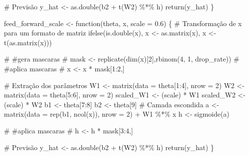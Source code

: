 \documentclass[
  a4paperpaper,
]{article}
\newenvironment{Shaded}{\begin{snugshade}}{\end{snugshade}}
\newcommand{\AttributeTok}[1]{\textcolor[rgb]{0.40,0.45,0.13}{#1}}
\newcommand{\CommentTok}[1]{\textcolor[rgb]{0.37,0.37,0.37}{#1}}
\newcommand{\ControlFlowTok}[1]{\textcolor[rgb]{0.00,0.23,0.31}{#1}}
\newcommand{\DecValTok}[1]{\textcolor[rgb]{0.68,0.00,0.00}{#1}}
\newcommand{\FloatTok}[1]{\textcolor[rgb]{0.68,0.00,0.00}{#1}}
\newcommand{\FunctionTok}[1]{\textcolor[rgb]{0.28,0.35,0.67}{#1}}
\newcommand{\NormalTok}[1]{\textcolor[rgb]{0.00,0.23,0.31}{#1}}
\newcommand{\OtherTok}[1]{\textcolor[rgb]{0.00,0.23,0.31}{#1}}
\newcommand{\SpecialCharTok}[1]{\textcolor[rgb]{0.37,0.37,0.37}{#1}}
\begin{document}
\begin{Shaded}
\begin{Highlighting}[]
  \CommentTok{\# Previsão}
\NormalTok{  y\_hat }\OtherTok{\textless{}{-}} \FunctionTok{as.double}\NormalTok{(b2 }\SpecialCharTok{+} \FunctionTok{t}\NormalTok{(W2) }\SpecialCharTok{\%*\%}\NormalTok{ h)}
  \FunctionTok{return}\NormalTok{(y\_hat)}
\NormalTok{\}}


\NormalTok{feed\_forward\_scale }\OtherTok{\textless{}{-}} \ControlFlowTok{function}\NormalTok{(theta, x, }\AttributeTok{scale =} \FloatTok{0.6}\NormalTok{) \{}
\CommentTok{\# Transformação de x para um formato de matriz}
  \FunctionTok{ifelse}\NormalTok{(}\FunctionTok{is.double}\NormalTok{(x), x }\OtherTok{\textless{}{-}} \FunctionTok{as.matrix}\NormalTok{(x), x }\OtherTok{\textless{}{-}} \FunctionTok{t}\NormalTok{(}\FunctionTok{as.matrix}\NormalTok{(x)))}
  
  \CommentTok{\# \#gera mascaras}
  \CommentTok{\# mask \textless{}{-} replicate(dim(x)[2],rbinom(4, 1, drop\_rate))}
  \CommentTok{\# \#aplica mascaras}
  \CommentTok{\# x \textless{}{-} x * mask[1:2,]}
  
  \CommentTok{\# Extração dos parâmetros}
\NormalTok{  W1 }\OtherTok{\textless{}{-}} \FunctionTok{matrix}\NormalTok{(}\AttributeTok{data =}\NormalTok{ theta[}\DecValTok{1}\SpecialCharTok{:}\DecValTok{4}\NormalTok{], }\AttributeTok{nrow =} \DecValTok{2}\NormalTok{)}
\NormalTok{  W2 }\OtherTok{\textless{}{-}} \FunctionTok{matrix}\NormalTok{(}\AttributeTok{data =}\NormalTok{ theta[}\DecValTok{5}\SpecialCharTok{:}\DecValTok{6}\NormalTok{], }\AttributeTok{nrow =} \DecValTok{2}\NormalTok{)}
\NormalTok{  scaled\_W1 }\OtherTok{\textless{}{-}}\NormalTok{ (scale) }\SpecialCharTok{*}\NormalTok{ W1}
\NormalTok{  scaled\_W2 }\OtherTok{\textless{}{-}}\NormalTok{ (scale) }\SpecialCharTok{*}\NormalTok{ W2}
\NormalTok{  b1 }\OtherTok{\textless{}{-}}\NormalTok{ theta[}\DecValTok{7}\SpecialCharTok{:}\DecValTok{8}\NormalTok{]}
\NormalTok{  b2 }\OtherTok{\textless{}{-}}\NormalTok{ theta[}\DecValTok{9}\NormalTok{]}
  \CommentTok{\# Camada escondida}
\NormalTok{  a }\OtherTok{\textless{}{-}} \FunctionTok{matrix}\NormalTok{(}\AttributeTok{data =} \FunctionTok{rep}\NormalTok{(b1, }\FunctionTok{ncol}\NormalTok{(x)), }\AttributeTok{nrow =} \DecValTok{2}\NormalTok{) }\SpecialCharTok{+}\NormalTok{ W1 }\SpecialCharTok{\%*\%}\NormalTok{ x}
\NormalTok{  h }\OtherTok{\textless{}{-}} \FunctionTok{sigmoide}\NormalTok{(a)}
  
  \CommentTok{\# \#aplica mascaras}
  \CommentTok{\# h \textless{}{-} h * mask[3:4,]  }
  
  \CommentTok{\# Previsão}
\NormalTok{  y\_hat }\OtherTok{\textless{}{-}} \FunctionTok{as.double}\NormalTok{(b2 }\SpecialCharTok{+} \FunctionTok{t}\NormalTok{(W2) }\SpecialCharTok{\%*\%}\NormalTok{ h)}
  \FunctionTok{return}\NormalTok{(y\_hat)}
\NormalTok{\}}




\end{Highlighting}
\end{Shaded}
\end{document}
